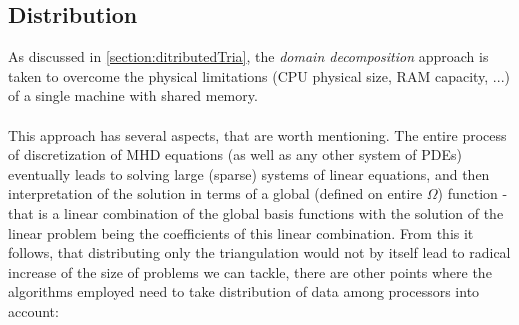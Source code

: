 \subsection{Distribution}
As discussed in \cref{section:ditributedTria}, the \textit{domain decomposition} approach is taken to overcome the physical limitations (CPU physical size, RAM capacity, ...) of a single machine with shared memory.
\paragraph{}
This approach has several aspects, that are worth mentioning. The entire process of discretization of MHD equations (as well as any other system of PDEs) eventually leads to solving large (sparse) systems of linear equations, and then interpretation of the solution in terms of a global (defined on entire $\Omega$) function - that is a linear combination of the global basis functions with the solution of the linear problem being the coefficients of this linear combination. From this it follows, that distributing only the triangulation would not by itself lead to radical increase of the size of problems we can tackle, there are other points where the algorithms employed need to take distribution of data among processors into account:
